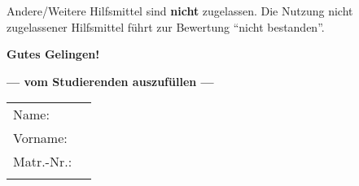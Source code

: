 \begin{coverpages}
\begin{minipage}[c]{0.5\textwidth}
\begin{minipage}[c]{0.96\textwidth}
\begin{itemize}
                \smallskip
                Andere/Weitere Hilfsmittel sind \textbf{nicht} zugelassen. Die
                Nutzung nicht zugelassener Hilfsmittel führt zur Bewertung
                \enquote{nicht bestanden}.
            \end{itemize}
            \bigskip
            \medskip
            \textbf{Gutes Gelingen!}
            \smallskip
            \vspace{2mm}
        \end{minipage}
    \end{minipage}
    \vrule
    \begin{minipage}[c]{0.5\textwidth}
        \bigskip
        \begin{center}
            \textcolor{headcolor}
            {\textbf{--- vom Studierenden auszufüllen ---}} \\[6mm]
        \end{center}
        \begin{center}
            \renewcommand{\arraystretch}{1.5}
            \begin{tabular}{@{\bfseries}lp{5cm}}
                Name:     & \dotfill \\[1mm]
                Vorname:  & \dotfill \\[1mm]
                Matr.-Nr.:& \dotfill \\[6mm]

                \multicolumn{2}{l}{\begin{minipage}[c]{76mm}
                \end{minipage}
                }\\[22mm]

            \end{tabular}
        \end{center}
        \smallskip
    \end{minipage}
    \par\hrulefill\par
    \vspace{10mm}


\end{coverpages}
